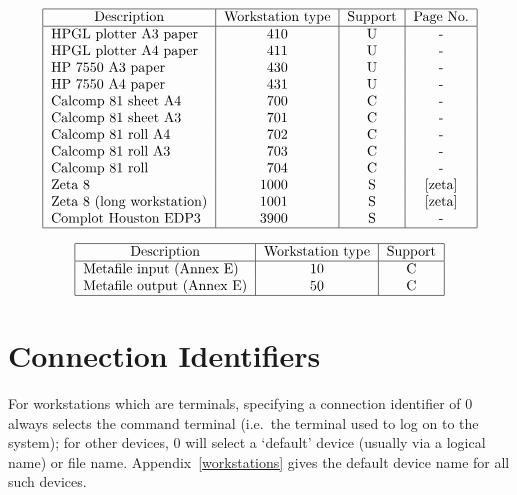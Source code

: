 \begin{table}\caption{Pen Plotters}
\[\begin{tabular}{|l|c|c|c|}\hline
\multicolumn{1}{|c|}{Description} &Workstation type &Support &Page No.\\\hline
HPGL plotter A3 paper             &410  &U &-\\
HPGL plotter A4 paper             &411  &U &-\\
HP 7550 A3 paper                  &430  &U &-\\
HP 7550 A4 paper                  &431  &U &-\\
Calcomp 81 sheet A4               &700  &C &-\\
Calcomp 81 sheet A3               &701  &C &-\\
Calcomp 81 roll A4                &702  &C &-\\
Calcomp 81 roll A3                &703  &C &-\\
Calcomp 81 roll                   &704  &C &-\\
Zeta 8                            &\makebox[0pt][r]{1}000 &S
&\pageref{zeta}\\
Zeta 8 (long workstation)         &\makebox[0pt][r]{1}001 &S
&\pageref{zeta}\\
Complot Houston EDP3              &\makebox[0pt][r]{3}900 &S&-\\
\hline\end{tabular}\]\end{table}

\begin{table}\caption{Metafile Workstations}\label{metafiles}
\[\begin{tabular}{|l|c|c|}\hline
\multicolumn{1}{|c|}{Description} &Workstation type &Support\\\hline
Metafile input (Annex E)  &10  &C\\
Metafile output (Annex E) &50  &C\\
\hline\end{tabular}\]\end{table}

\section{Connection Identifiers}

For workstations which are terminals, specifying a connection identifier
of 0 always selects the command terminal (i.e.\ the terminal used to log
on to the system); for other devices, 0 will select a `default' device (usually
via a logical name) or file name. Appendix~\ref{workstations} gives the 
default device name
for all such devices.

